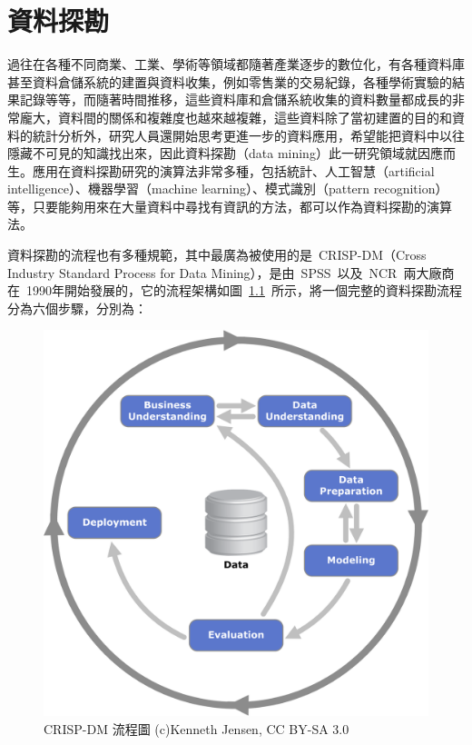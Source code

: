 \renewcommand\thetable{\arabic{chapter}-\arabic{table}}
\renewcommand{\theequation}{\arabic{chapter}-\arabic{equation}}
\chapter{資料探勘}

過往在各種不同商業、工業、學術等領域都隨著產業逐步的數位化，有各種資料庫甚至資料倉儲系統的建置與資料收集，例如零售業的交易紀錄，各種學術實驗的結果記錄等等，而隨著時間推移，這些資料庫和倉儲系統收集的資料數量都成長的非常龐大，資料間的關係和複雜度也越來越複雜，這些資料除了當初建置的目的和資料的統計分析外，研究人員還開始思考更進一步的資料應用，希望能把資料中以往隱藏不可見的知識找出來，因此資料探勘（data mining）此一研究領域就因應而生。應用在資料探勘研究的演算法非常多種，包括統計、人工智慧（artificial intelligence）、機器學習（machine learning）、模式識別（pattern recognition）等，只要能夠用來在大量資料中尋找有資訊的方法，都可以作為資料探勘的演算法。

資料探勘的流程也有多種規範，其中最廣為被使用的是~CRISP-DM\cite{shearer2000crisp}（Cross Industry Standard Process for Data Mining），是由~SPSS~以及~NCR~兩大廠商在~1990年開始發展的，它的流程架構如圖~\ref{fig:CRISP-DM}\cite{crispdmdiagram}~所示，將一個完整的資料探勘流程分為六個步驟，分別為：

\begin{figure}[hbtp]
  \begin{center}
    \includegraphics[width=1.0\textwidth]{figures/1196px-CRISP-DM_Process_Diagram.png}
    \caption{CRISP-DM 流程圖 (c)Kenneth Jensen, CC BY-SA 3.0} 
    \label{fig:CRISP-DM}
  \end{center}
\end{figure}


